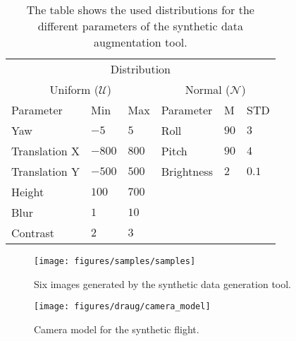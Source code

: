 \documentclass{report}
\begin{document}
\begin{table}[h!]
  \centering
  \begin{tabular}{llllll}
    \toprule
    \multicolumn{6}{c}{Distribution}                                                         \\
    \multicolumn{3}{c}{Uniform ($\mathcal{U}$)} & \multicolumn{3}{c}{Normal ($\mathcal{N}$)} \\
    \cmidrule(r){1-3}\cmidrule(r){4-6}
    Parameter                                   & Min   & Max   & Parameter  & M    & STD    \\
    \cmidrule(r){1-3}\cmidrule(r){4-6}
    Yaw                                         & $-5$   & $5$ & Roll       & $90$ & $3$    \\
    Translation X                               & $-800$ & $800$ & Pitch      & $90$ & $4$    \\
    Translation Y                               & $-500$ & $500$ & Brightness & $2$  & $0.1$  \\
    Height                                      & $100$ & $700$ &            &      &        \\
    Blur                                        & $1$   & $10$  &            &      &        \\
    Contrast                                    & $2$   & $3$   &            &      &        \\
    \bottomrule
  \end{tabular}
  \caption[Distributions for the different
  parameters of the synthetic data augmentation tool.]{The table shows the used distributions for the different
    parameters of the synthetic data augmentation tool.}
  \label{tab:distributions}

\end{table}

\begin{figure}[h!]
\begin{center}
\texttt{[image: figures/samples/samples]}
\caption{{\label{fig:montage} 
Six images generated by the synthetic data generation tool.%
}}
\end{center}
\end{figure}

\begin{figure}[h!]
\begin{center}
\texttt{[image: figures/draug/camera\_model]}
\caption{{Camera model for the synthetic flight.%
}}
\end{center}
\end{figure}
\end{document}
